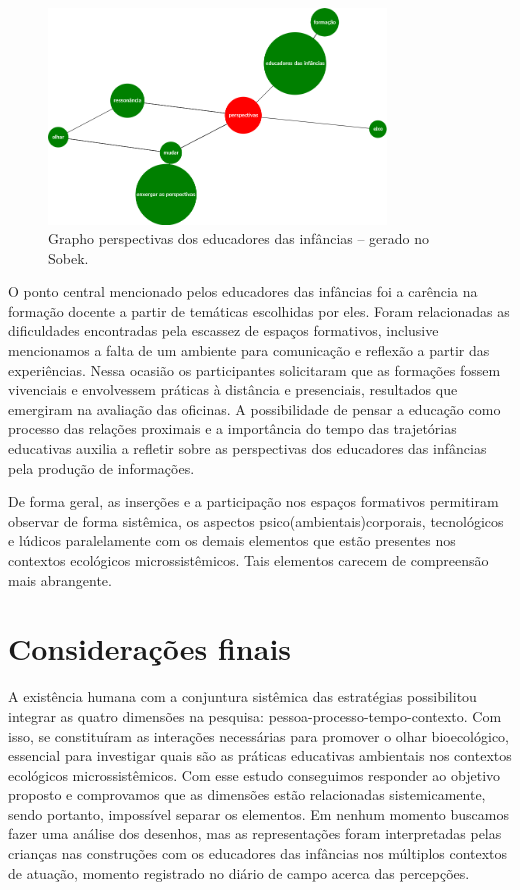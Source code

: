 \documentclass{textolivre}
\begin{document}
\begin{figure}[h!]
 \centering
 \includegraphics[width=0.8\textwidth]{figure09.png}
 \caption{Grapho perspectivas dos educadores das infâncias -- gerado no Sobek.}
 \label{fig-fig09}
\end{figure}

O ponto central mencionado pelos educadores das infâncias foi a carência na formação docente a partir de temáticas escolhidas por eles. Foram relacionadas as dificuldades encontradas pela escassez de espaços formativos, inclusive mencionamos a falta de um ambiente para comunicação e reflexão a partir das experiências. Nessa ocasião os participantes solicitaram que as formações fossem vivenciais e envolvessem práticas à distância e presenciais, resultados que emergiram na avaliação das oficinas. A possibilidade de pensar a educação como processo das relações proximais e a importância do tempo das trajetórias educativas auxilia a refletir sobre as perspectivas dos educadores das infâncias pela produção de informações.

De forma geral, as inserções e a participação nos espaços formativos permitiram observar de forma sistêmica, os aspectos psico(ambientais)corporais, tecnológicos e lúdicos paralelamente com os demais elementos que estão presentes nos contextos ecológicos microssistêmicos. Tais elementos carecem de compreensão mais abrangente.


\section{Considerações finais}\label{sec-consideracoes}
A existência humana com a conjuntura sistêmica das estratégias possibilitou integrar as quatro dimensões na pesquisa: pessoa-processo-tempo-contexto. Com isso, se constituíram as interações necessárias para promover o olhar bioecológico, essencial para investigar quais são as práticas educativas ambientais nos contextos ecológicos microssistêmicos. Com esse estudo conseguimos responder ao objetivo proposto e comprovamos que as dimensões estão relacionadas sistemicamente, sendo portanto, impossível separar os elementos. Em nenhum momento buscamos fazer uma análise dos desenhos, mas as representações foram interpretadas pelas crianças nas construções com os educadores das infâncias nos múltiplos contextos de atuação, momento registrado no diário de campo acerca das percepções.
\end{document}
